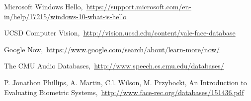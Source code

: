 \cleardoublepage
{}
{}
\begin{thebibliography}{99}

Microsoft Windows Hello,\ \url{https://support.microsoft.com/en-in/help/17215/windows-10-what-is-hello}

UCSD Computer Vision,\ \url{http://vision.ucsd.edu/content/yale-face-database}

Google Now,\ \url{https://www.google.com/search/about/learn-more/now/}

The CMU Audio Databases,\ \url{http://www.speech.cs.cmu.edu/databases/}

P. Jonathon Phillips, A. Martin, C.l. Wilson, M. Przybocki, An Introduction to Evaluating Biometric Systems,\ \url{http://www.face-rec.org/databases/151436.pdf}

\end{thebibliography}
